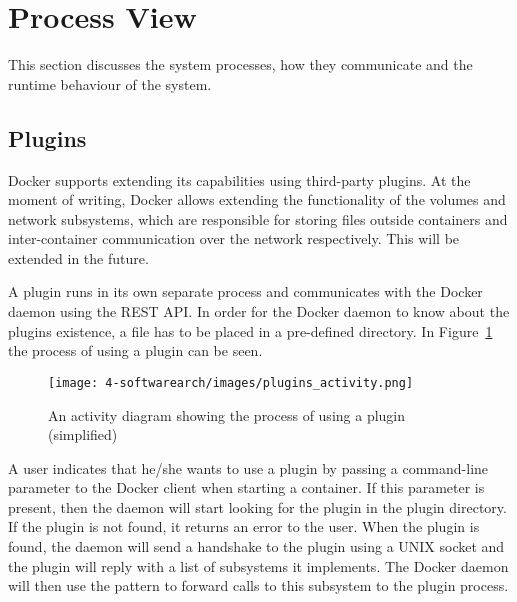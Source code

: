 
\section{Process View}
\label{sec:viewprocess}
This section discusses the system processes, how they communicate and the runtime behaviour of the system.

\subsection{Plugins}
Docker supports extending its capabilities using third-party plugins. At the moment of writing, Docker allows extending the functionality of the volumes and network subsystems, which are responsible for storing files outside containers and inter-container communication over the network respectively. This will be extended in the future\cite{dockerplugindocs}.

A plugin runs in its own separate process and communicates with the Docker daemon using the REST API. In order for the Docker daemon to know about the plugins existence, a file has to be placed in a pre-defined directory. %
In Figure~\ref{fig:activity_plugin} the process of using a plugin can be seen.
\begin{figure}[H]
\caption{An activity diagram showing the process of using a plugin (simplified)}
\centering
\texttt{[image: 4-softwarearch/images/plugins\_activity.png]}
\label{fig:activity_plugin}
\end{figure}

A user indicates that he/she wants to use a plugin by passing a command-line parameter to the Docker client when starting a container. If this parameter is present, then the daemon will start looking for the plugin in the plugin directory. If the plugin is not found, it returns an error to the user. 
When the plugin is found, the daemon will send a handshake to the plugin using a UNIX socket and the plugin will reply with a list of subsystems it implements. 
The Docker daemon will then use the  pattern to forward calls to this subsystem to the plugin process.
